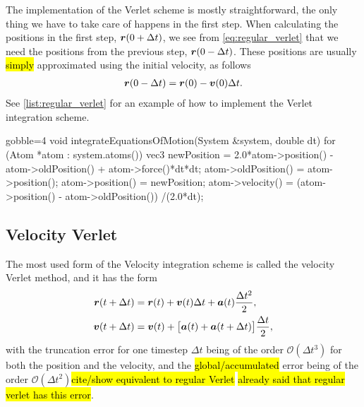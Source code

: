 The implementation of the Verlet scheme is mostly straightforward, the only thing we have to take care of happens in the first step. When calculating the positions in the first step, $\boldsymbol{r}(0+\Delta t)$, we see from \cref{eq:regular_verlet} that we need the positions from the previous step, $\boldsymbol{r}(0-\Delta t)$. These positions are usually \hl{simply} approximated using the initial velocity, as follows
\begin{align*}
    \boldsymbol{r}(0-\Delta t) = \boldsymbol{r}(0) - \boldsymbol{v}(0)\Delta t.
\end{align*}
See \cref{list:regular_verlet} for an example of how to implement the Verlet integration scheme.
%
\begin{listing}[!htb]%
\begin{cppcode*}{gobble=4}
    void integrateEquationsOfMotion(System &system, double dt)
    {
        for (Atom *atom : system.atoms())
        {
            vec3 newPosition = 2.0*atom->position() - atom->oldPosition() 
                               + atom->force()*dt*dt;
            atom->oldPosition() = atom->position();
            atom->position() = newPosition;
            atom->velocity() = (atom->position() - atom->oldPosition())
                               /(2.0*dt);
        }
    }
\end{cppcode*}
\caption{%
    Implentation of \texttt{integrateEquationsOfMotion} from \cref{list:simple_md_program}.%
    \label{list:regular_verlet}%
}%
\end{listing}%

\subsection{Velocity Verlet}
The most used form of the Velocity integration scheme is called the velocity Verlet method\cite{swope1982computer}, and it has the form
\begin{align}
    \boldsymbol{r}(t + \Delta t) &= \boldsymbol{r}(t) + \boldsymbol{v}(t)\Delta t + \boldsymbol{a}(t)\frac{\Delta t^2}{2}, \label{eq:velocity_verlet_position}\\
    \boldsymbol{v}(t + \Delta t) &= \boldsymbol{v}(t) + \big[\boldsymbol{a}(t) + \boldsymbol{a}(t + \Delta t)\big] \frac{\Delta t}{2}, \label{eq:velocity_verlet_velocity}
\end{align}
with the truncation error for one timestep $\Delta t$ being of the order $\mathcal{O}(\Delta t^3)$ for both the position and the velocity, and the \hl{global/accumulated} error being of the order $\mathcal{O}(\Delta t^2)$\hl{cite/show equivalent to regular Verlet} \hl{already said that regular verlet has this error}. 

